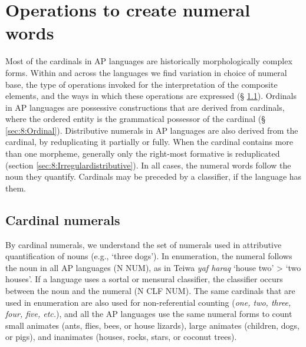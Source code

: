 \section{Operations to create numeral words} 
\label{sec:8:Operations}
Most of the cardinals in AP languages are historically morphologically complex forms. Within and across the languages we find variation in choice of numeral base, the type of operations invoked for the interpretation of the composite elements, and the ways in which these operations are expressed ({\S} \ref{sec:8:Cardinal}). Ordinals in AP languages are possessive constructions that are derived from cardinals, where the ordered entity is the grammatical possessor of the cardinal ({\S} \ref{sec:8:Ordinal}). Distributive numerals in AP languages are also derived from the cardinal, by reduplicating it partially or fully. When the cardinal contains more than one morpheme, generally only the right-most formative is reduplicated (section \ref{sec:8:Irregulardistributive}).  In all cases, the numeral words follow the noun they quantify. Cardinals may be preceded by a classifier, if the language has them. 

\subsection{Cardinal numerals}
\label{sec:8:Cardinal}
By cardinal numerals, we understand the set of numerals used in attributive quantification of nouns (e.g., `three dogs'). In enumeration, the numeral follows the noun in all AP languages (N NUM), as in Teiwa \textit{yaf haraq} `house two' {\textgreater} `two houses'. If a language uses a sortal or mensural classifier, the classifier occurs between the noun and the numeral (N CLF NUM). The same cardinals that are used in enumeration are also used for non-referential counting (\textit{one, two, three, four, five, etc.}), and all the AP languages use the same numeral forms to count small animates (ants, flies, bees, or house lizards), large animates (children, dogs, or pigs), and inanimates (houses, rocks, stars, or coconut trees).

